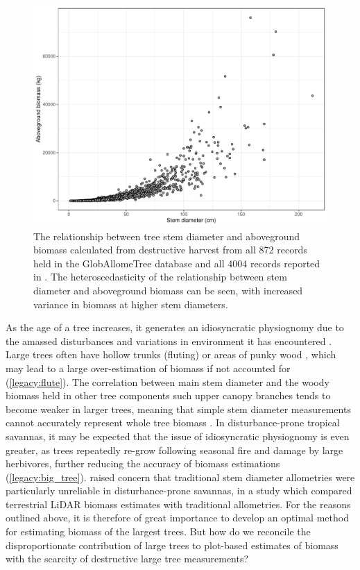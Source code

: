 \begin{refsection}
\begin{figure}
	\includegraphics[width=\linewidth]{img/allometry}
	\caption[Scatter plot of stem diameter and biomass from GlobAllomeTree database]{The relationship between tree stem diameter and aboveground biomass calculated from destructive harvest from all 872 records held in the GlobAllomeTree database \citep{Henry2013} and all 4004 records reported in \citet{Chave2014}. The heteroscedasticity of the relationship between stem diameter and aboveground biomass can be seen, with increased variance in biomass at higher stem diameters.}
	\label{legacy:allometry}
\end{figure}

As the age of a tree increases, it generates an idiosyncratic physiognomy due to the amassed disturbances and variations in environment it has encountered \citep{Lindenmayer2016}. Large trees often have hollow trunks (fluting) or areas of punky wood \citep{Chambers2001, Ruxton2014}, which may lead to a large over-estimation of biomass if not accounted for (\autoref{legacy:flute}). The correlation between main stem diameter and the woody biomass held in other tree components such upper canopy branches tends to become weaker in larger trees, meaning that simple stem diameter measurements cannot accurately represent whole tree biomass \citep{Goodman2014, Saglam2020}. In disturbance-prone tropical savannas, it may be expected that the issue of idiosyncratic physiognomy is even greater, as trees repeatedly re-grow following seasonal fire and damage by large herbivores, further reducing the accuracy of biomass estimations (\autoref{legacy:big_tree}). \citet{Luck2020} raised concern that traditional stem diameter allometries were particularly unreliable in disturbance-prone savannas, in a study which compared terrestrial LiDAR biomass estimates with traditional allometries. For the reasons outlined above, it is therefore of great importance to develop an optimal method for estimating biomass of the largest trees. But how do we reconcile the disproportionate contribution of large trees to plot-based estimates of biomass with the scarcity of destructive large tree measurements?


\end{refsection}
